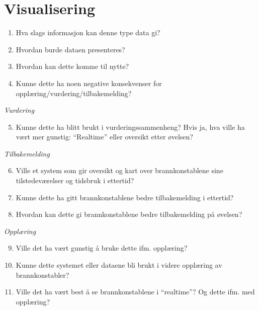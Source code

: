 \documentclass[../Main/thesis.tex]{subfiles}
\begin{document}
\section*{Visualisering}
\begin{enumerate}
	\item Hva slags informasjon kan denne type data gi?
	\item Hvordan burde dataen presenteres? 
	\item Hvordan kan dette komme til nytte?
	\item Kunne dette ha noen negative konsekvenser for opplæring/vurdering/tilbakemelding?
\end{enumerate}
\textit{Vurdering}
\begin{enumerate}
	\setcounter{enumi}{4}
	\item Kunne dette ha blitt brukt i vurderingssammenheng? Hvis ja, hva ville ha vært mer gunstig: “Realtime” eller oversikt etter øvelsen?
\end{enumerate}
\textit{Tilbakemelding}
\begin{enumerate}
	\setcounter{enumi}{5}
	\item Ville et system som gir oversikt og kart over brannkonstablene sine tilstedeværelser og tidsbruk i ettertid?
	\item Kunne dette ha gitt brannkonstablene bedre tilbakemelding i ettertid?
	\item Hvordan kan dette gi brannkonstablene bedre tilbakemelding på øvelsen?
\end{enumerate}
\textit{Opplæring}
\begin{enumerate}
	\setcounter{enumi}{8}
	\item Ville det ha vært gunstig å bruke dette ifm. opplæring?
	\item Kunne dette systemet eller dataene bli brukt i videre opplæring av brannkonstabler?
	\item Ville det ha vært best å se brannkonstablene i “realtime”? Og dette ifm. med opplæring?
\end{enumerate}
\end{document}
